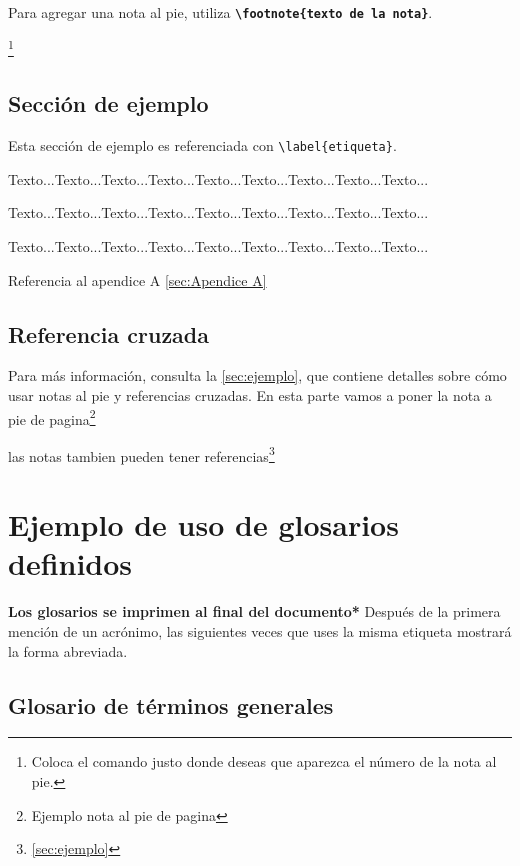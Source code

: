  Para agregar una nota al pie, utiliza \textbf{\texttt{\textbackslash footnote\{texto de la nota\}}}.
 
 

\footnote{Coloca el comando justo donde deseas que aparezca el número de la nota al pie.}
 
 \subsection{Sección de ejemplo} 

 \label{sec:ejemplo}%
 Esta sección de ejemplo es referenciada con \texttt{\textbackslash label\{etiqueta\}}.


 Texto...Texto...Texto...Texto...Texto...Texto...Texto...Texto...Texto...

 Texto...Texto...Texto...Texto...Texto...Texto...Texto...Texto...Texto...

 Texto...Texto...Texto...Texto...Texto...Texto...Texto...Texto...Texto...

 Referencia al apendice A \autoref{sec:Apendice A}

 \subsection{Referencia cruzada} 
 Para más información, consulta la \autoref{sec:ejemplo}, que contiene detalles sobre cómo usar notas al pie 
 y referencias cruzadas.
 En esta parte vamos a poner la nota a pie de pagina\footnote{Ejemplo nota al pie de pagina}
 
 las notas tambien pueden tener referencias\footnote{\autoref{sec:ejemplo}}

 \clearpage 
 
 \section{Ejemplo de uso de glosarios definidos}

 \textbf{Los glosarios se imprimen al final del documento*}
 Después de la primera mención de un acrónimo,
 las siguientes veces que uses la misma etiqueta mostrará la forma abreviada. 
 \subsection{Glosario de términos generales}
 
